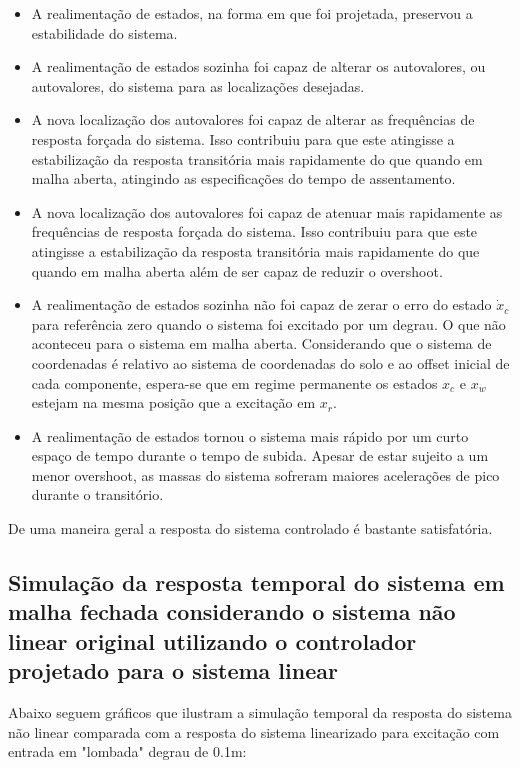     \begin{itemize}
        \item A realimentação de estados, na forma em que foi projetada, preservou a estabilidade do sistema.
        \item A realimentação de estados sozinha foi capaz de alterar os autovalores, ou autovalores, do sistema para as localizações desejadas.
        \item A nova localização dos autovalores foi capaz de alterar as frequências de resposta forçada do sistema. Isso contribuiu para que este atingisse a estabilização da resposta transitória mais rapidamente do que quando em malha aberta, atingindo as especificações do tempo de assentamento.
        \item A nova localização dos autovalores foi capaz de atenuar mais rapidamente as frequências de resposta forçada do sistema. Isso contribuiu para que este atingisse a estabilização da resposta transitória mais rapidamente do que quando em malha aberta além de ser capaz de reduzir o overshoot.
        \item A realimentação de estados sozinha não foi capaz de zerar o erro do estado $\dot{x}_c$ para referência zero quando o sistema foi excitado por um degrau. O que não aconteceu para o sistema em malha aberta. Considerando que o sistema de coordenadas é relativo ao sistema de coordenadas do solo e ao offset inicial de cada componente, espera-se que em regime permanente os estados $x_c$ e $x_w$ estejam na mesma posição que a excitação em $x_r$.
        \item A realimentação de estados tornou o sistema mais rápido por um curto espaço de tempo durante o tempo de subida. Apesar de estar sujeito a um menor overshoot, as massas do sistema sofreram maiores acelerações de pico durante o transitório.
    \end{itemize}
    
    De uma maneira geral a resposta do sistema controlado é bastante satisfatória.
    
        \subsection{Simulação da resposta temporal do sistema em malha fechada considerando o sistema não linear original utilizando o controlador projetado para o sistema linear}
    
    Abaixo seguem gráficos que ilustram a simulação temporal da resposta do sistema não linear comparada com a resposta do sistema linearizado para excitação com entrada em "lombada" degrau de 0.1m:

